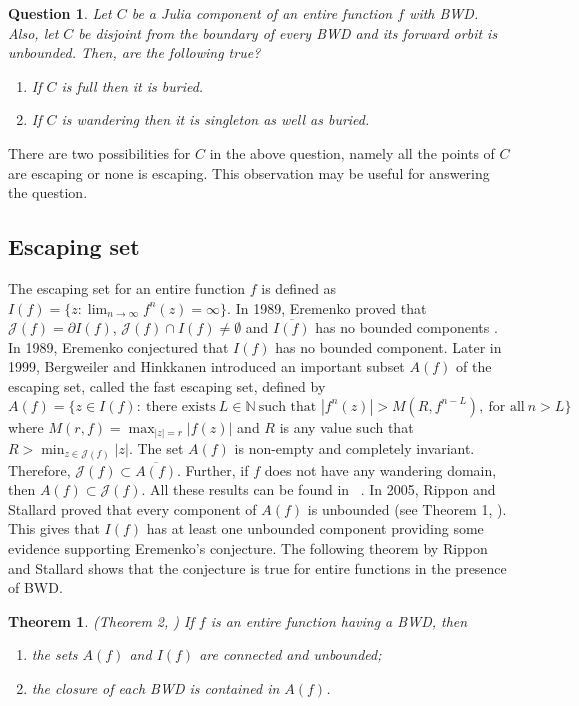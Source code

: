 \documentclass[11pt,a4paper]{article}
\newtheorem{theorem}{Theorem}[section]
\newtheorem{Question}{Question}
\begin{document}
 	\begin{Question}
 	Let $C$ be a  Julia component of an entire function $f$ with BWD. Also, let $C$ be disjoint from  the boundary of every BWD and its forward orbit  is unbounded. Then, are the following true?
 	
 	\begin{enumerate}
 		\item If $C$ is full then it is buried.
 		\item If $C$ is wandering then it is singleton as well as buried. 
 	\end{enumerate} 
 	\end{Question}
 There are two possibilities for $C$ in the above question, namely all the points of $C$  are escaping or none is escaping. This observation may be useful for answering the question. 
		\subsection{Escaping set}
	The escaping set for an entire function $f$ is defined as $I(f)=\{z: \lim_{n \to \infty}f^n (z)=\infty\}$. 
	 In 1989, Eremenko proved that $\mathcal{J}(f)=\partial I(f)$, $\mathcal{J}(f)\cap I(f)\neq\emptyset$ and $\overline{I(f)}$ has no bounded components  \cite{Eremenko 1989}.  In 1989, Eremenko conjectured that $I(f)$ has no bounded component. Later in 1999, Bergweiler and Hinkkanen \cite{BergHinkk 1999} introduced an important subset $A(f)$ of the escaping set, called the fast escaping set, defined by
	$$A(f)=\{z \in I(f):~\mbox{there exists}~L\in\mathbb{N}~\mbox{such that }  |f^n(z)|>M(R, f^{n-L}), ~\mbox{for all}~n>L \}$$
	where $M(r,f)=\max_{|z|=r} |f(z)|$ and $R$ is any value such that $R>\min_{z\in\mathcal{J}(f)}|z|$. The set $A(f)$ is non-empty and completely invariant. Therefore, $\mathcal{J}(f)\subset\overline{A(f)}$. Further, if $f$ does not have any wandering domain, then $A(f)\subset\mathcal{J}(f)$. All these results can be found in ~\cite{BergHinkk 1999}. In 2005, Rippon and Stallard proved that every component of $A(f)$ is unbounded (see Theorem 1, \cite{RipponStallard 2005}). This gives that $I(f)$ has at least one unbounded component providing some evidence supporting Eremenko's conjecture.  The following theorem by Rippon and Stallard shows that the conjecture is true for entire functions in the presence of BWD.
	
	\begin{theorem}(Theorem 2, \cite{RipponStallard 2005})
		If $f$ is an entire function having a BWD, then
		\begin{enumerate}
			\item the sets $A(f)$ and $I(f)$ are connected and unbounded;
			\item the closure of each BWD  is contained in  $A(f)$.
		\end{enumerate}
	\end{theorem}
 
\end{document}
